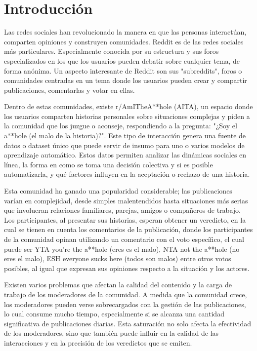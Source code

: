 \section{Introducción}

Las redes sociales han revolucionado la manera en que las personas interactúan, comparten opiniones y construyen comunidades. Reddit es de las redes sociales más particulares. Especialmente conocida por su estructura y sus foros especializados en los que los usuarios pueden debatir sobre cualquier tema, de forma anónima. Un aspecto interesante de Reddit son sus "subreddits", foros o comunidades centradas en un tema donde los usuarios pueden crear y compartir publicaciones, comentarlas y votar en ellas. 

Dentro de estas comunidades, existe r/AmITheA**hole (AITA), un espacio donde los usuarios comparten historias personales sobre situaciones complejas y piden a la comunidad que los juzgue o aconseje, respondiendo a la pregunta: "¿Soy el a**hole (el malo de la historia)?". Este tipo de interacción genera una fuente de datos o dataset único que puede servir de insumo para uno o varios modelos de aprendizaje automático. Estos datos permiten analizar las dinámicas sociales en línea, la forma en como se toma una decisión colectiva y si es posible automatizarla, y qué factores influyen en la aceptación o rechazo de una historia. 

Esta comunidad ha ganado una popularidad considerable; las publicaciones varían en complejidad, desde simples malentendidos hasta situaciones más serias que involucran relaciones familiares, parejas, amigos o compañeros de trabajo. Los participantes, al presentar sus historias, esperan obtener un veredicto, en la cual se tienen en cuenta los comentarios de la publicación, donde los participantes de la comunidad opinan utilizando un comentario con el voto específico, el cual puede ser YTA you’re the a**hole (eres es el malo), NTA not the a**hole (no eres el malo), ESH everyone sucks here (todos son malos) entre otros votos posibles, al igual que expresan sus opiniones respecto a la situación y los actores.

Existen varios problemas que afectan la calidad del contenido y la carga de trabajo de los moderadores de la comunidad. A medida que la comunidad crece, los moderadores pueden verse sobrecargados con la gestión de las publicaciones, lo cual consume mucho tiempo, especialmente si se alcanza una cantidad significativa de publicaciones diarias. Esta saturación no solo afecta la efectividad de los moderadores, sino que también puede influir en la calidad de las interacciones y en la precisión de los veredictos que se emiten.

